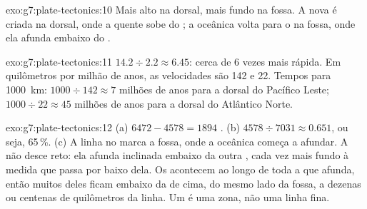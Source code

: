 \begin{solution}{exo:g7:plate-tectonics:10}
Mais alto na dorsal, mais fundo na fossa. A  nova é criada na dorsal,
onde a  quente sobe do ; a  oceânica volta para o  na
fossa, onde ela afunda embaixo do .
\end{solution}

\begin{solution}{exo:g7:plate-tectonics:11}
$14.2 \div 2.2 \approx 6.45$: cerca de 6 vezes mais rápida.
Em quilômetros por milhão de anos, as velocidades são 142 e
22. Tempos para \qty{1000}{km}: $1000 \div 142 \approx 7$ milhões de anos
para a dorsal do Pacífico Leste; $1000 \div 22 \approx 45$ milhões de anos
para a dorsal do Atlântico Norte.
\end{solution}

\begin{solution}{exo:g7:plate-tectonics:12}
(a) $6472 - 4578 = 1894$ . (b) $4578 \div 7031 \approx 0.651$,
ou seja, 65\,\%. (c) A linha no  marca a fossa, onde a  oceânica
começa a afundar. A  não desce reto: ela afunda inclinada embaixo da
outra , cada vez mais fundo à medida que passa por baixo dela. Os
 acontecem ao longo de toda a  que afunda, então muitos
deles ficam embaixo da  de cima, do mesmo lado da fossa, a dezenas ou
centenas de quilômetros da linha. Um  é uma zona, não uma
linha fina.
\end{solution}

